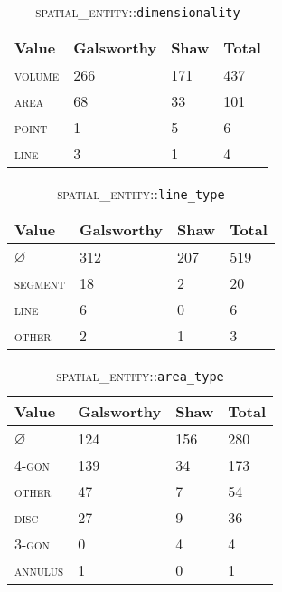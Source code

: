 \documentclass[11pt]{article}
\begin{document}
\begin{appendix}
    \begin{table}[here]
    \begin{center}
    \begin{tabular}
        {|l|l|l|l|}
        \hline  \textbf{Value} & \textbf{Galsworthy} & \textbf{Shaw} & \textbf{Total} \\
        \hline \textsc{volume} & 266 & 171 & 437 \\
        \hline \textsc{area} & 68 & 33 & 101     \\
        \hline \textsc{point} & 1 & 5 & 6        \\
        \hline \textsc{line} & 3 & 1 & 4         \\
        \hline
    \end{tabular}
    \caption{\textsc{spatial\_entity}::\texttt{dimensionality}}
    \label{tab:dimensionality-counts}
    \end{center}
    \end{table}
    
    \begin{table}[here]
    \begin{center}
    \begin{tabular}
        {|l|l|l|l|}
        \hline  \textbf{Value} & \textbf{Galsworthy} & \textbf{Shaw} & \textbf{Total} \\
        \hline $\varnothing$ & 312 & 207 & 519  \\
        \hline \textsc{segment} & 18 & 2 & 20   \\
        \hline \textsc{line} & 6 & 0 & 6        \\
        \hline \textsc{other} & 2 & 1 & 3       \\
        \hline
    \end{tabular}
    \caption{\textsc{spatial\_entity}::\texttt{line\_type}}
    \label{tab:line_type-counts}
    \end{center}
    \end{table}

    \begin{table}[here]
    \begin{center}
    \begin{tabular}
        {|l|l|l|l|}
        \hline  \textbf{Value} & \textbf{Galsworthy} & \textbf{Shaw} & \textbf{Total} \\
        \hline $\varnothing$ & 124 & 156 & 280 \\
        \hline \textsc{4-gon} & 139 & 34 & 173 \\
        \hline \textsc{other} & 47 & 7 & 54    \\
        \hline \textsc{disc} & 27 & 9 & 36     \\
        \hline \textsc{3-gon} & 0 & 4 & 4      \\
        \hline \textsc{annulus} & 1 & 0 & 1    \\
        \hline
    \end{tabular}
    \caption{\textsc{spatial\_entity}::\texttt{area\_type}}
    \label{tab:area_type-counts}
    \end{center}
    \end{table}
    

\end{appendix}
\end{document}
